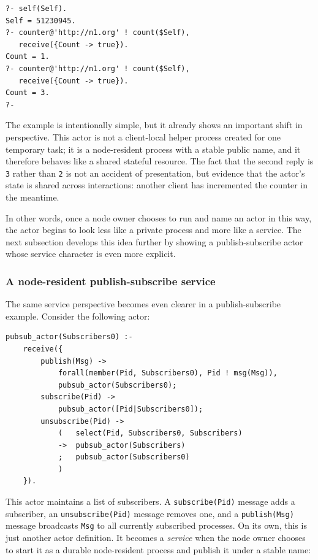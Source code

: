 \begin{verbatim}
?- self(Self).
Self = 51230945.
?- counter@'http://n1.org' ! count($Self),
   receive({Count -> true}).
Count = 1.
?- counter@'http://n1.org' ! count($Self),
   receive({Count -> true}).
Count = 3.
?-
\end{verbatim}

\noindent The example is intentionally simple, but it already shows an important shift in perspective. This actor is not a client-local helper process created for one temporary task; it is a node-resident process with a stable public name, and it therefore behaves like a shared stateful resource. The fact that the second reply is \texttt{3} rather than \texttt{2} is not an accident of presentation, but evidence that the actor's state is shared across interactions: another client has incremented the counter in the meantime.

In other words, once a node owner chooses to run and name an
actor in this way, the actor begins to look less like a private process
and more like a service. The next subsection develops this idea further
by showing a publish-subscribe actor whose service character is even more
explicit.

\subsubsection{A node-resident publish-subscribe service}

The same service perspective becomes even clearer in a publish-subscribe
example. Consider the following actor:

\begin{verbatim}
pubsub_actor(Subscribers0) :-
    receive({
        publish(Msg) ->
            forall(member(Pid, Subscribers0), Pid ! msg(Msg)),
            pubsub_actor(Subscribers0);
        subscribe(Pid) ->
            pubsub_actor([Pid|Subscribers0]);
        unsubscribe(Pid) ->
            (   select(Pid, Subscribers0, Subscribers)
            ->  pubsub_actor(Subscribers)
            ;   pubsub_actor(Subscribers0)
            )
    }).
\end{verbatim}

\noindent This actor maintains a list of subscribers. A
\texttt{subscribe(Pid)} message adds a subscriber, an
\texttt{unsubscribe(Pid)} message removes one, and a
\texttt{publish(Msg)} message broadcasts \texttt{Msg} to all
currently subscribed processes. On its own, this is just another
actor definition. It becomes a \emph{service} when the node owner
chooses to start it as a durable node-resident process and publish it
under a stable name:


